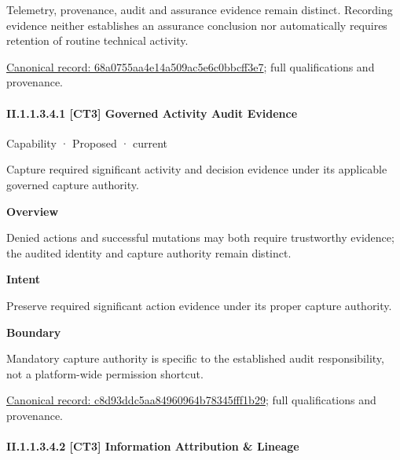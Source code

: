 Telemetry, provenance, audit and assurance evidence remain distinct. Recording evidence neither establishes an assurance conclusion nor automatically requires retention of routine technical activity.


{\footnotesize \href{../../../../../../../continuum/strategy/capability/68a0755aa4e14a509ac5e6c0bbcff3e7.md}{Canonical record: 68a0755aa4e14a509ac5e6c0bbcff3e7}; full qualifications and provenance.}\par
\paragraph*{II.1.1.3.4.1 [CT3] Governed Activity Audit Evidence}
\label{navigation:II.1.1.3.4.1}

\label{element:c8d93ddc5aa84960964b78345fff1b29}
{\small Capability · Proposed · current}\par

Capture required significant activity and decision evidence under its applicable governed capture authority.



\textbf{Overview}



Denied actions and successful mutations may both require trustworthy evidence; the audited identity and capture authority remain distinct.



\textbf{Intent}



Preserve required significant action evidence under its proper capture authority.



\textbf{Boundary}



Mandatory capture authority is specific to the established audit responsibility, not a platform-wide permission shortcut.


{\footnotesize \href{../../../../../../../continuum/strategy/capability/c8d93ddc5aa84960964b78345fff1b29.md}{Canonical record: c8d93ddc5aa84960964b78345fff1b29}; full qualifications and provenance.}\par
\paragraph*{II.1.1.3.4.2 [CT3] Information Attribution \& Lineage}
\label{navigation:II.1.1.3.4.2}

